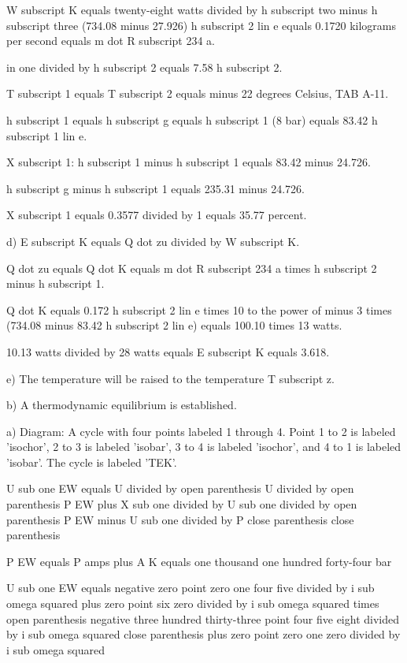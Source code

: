 W subscript K equals twenty-eight watts divided by h subscript two minus h subscript three (734.08 minus 27.926) h subscript 2 lin e equals 0.1720 kilograms per second equals m dot R subscript 234 a.

in one divided by h subscript 2 equals 7.58 h subscript 2.

T subscript 1 equals T subscript 2 equals minus 22 degrees Celsius, TAB A-11.

h subscript 1 equals h subscript g equals h subscript 1 (8 bar) equals 83.42 h subscript 1 lin e.

X subscript 1: h subscript 1 minus h subscript 1 equals 83.42 minus 24.726.

h subscript g minus h subscript 1 equals 235.31 minus 24.726.

X subscript 1 equals 0.3577 divided by 1 equals 35.77 percent.

d) E subscript K equals Q dot zu divided by W subscript K.

Q dot zu equals Q dot K equals m dot R subscript 234 a times h subscript 2 minus h subscript 1.

Q dot K equals 0.172 h subscript 2 lin e times 10 to the power of minus 3 times (734.08 minus 83.42 h subscript 2 lin e) equals 100.10 times 13 watts.

10.13 watts divided by 28 watts equals E subscript K equals 3.618.

e) The temperature will be raised to the temperature T subscript z.

b) A thermodynamic equilibrium is established.

a) Diagram: A cycle with four points labeled 1 through 4. Point 1 to 2 is labeled 'isochor', 2 to 3 is labeled 'isobar', 3 to 4 is labeled 'isochor', and 4 to 1 is labeled 'isobar'. The cycle is labeled 'TEK'.

U sub one EW equals U divided by open parenthesis U divided by open parenthesis P EW plus X sub one divided by U sub one divided by open parenthesis P EW minus U sub one divided by P close parenthesis close parenthesis

P EW equals P amps plus A K equals one thousand one hundred forty-four bar

U sub one EW equals negative zero point zero one four five divided by i sub omega squared plus zero point six zero divided by i sub omega squared times open parenthesis negative three hundred thirty-three point four five eight divided by i sub omega squared close parenthesis plus zero point zero one zero divided by i sub omega squared


